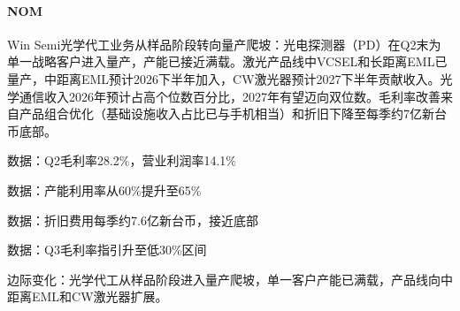 \documentclass[11pt]{ctexart}
\begin{document}
\paragraph{NOM} Win Semi光学代工业务从样品阶段转向量产爬坡：光电探测器（PD）在Q2末为单一战略客户进入量产，产能已接近满载。激光产品线中VCSEL和长距离EML已量产，中距离EML预计2026下半年加入，CW激光器预计2027下半年贡献收入。光学通信收入2026年预计占高个位数百分比，2027年有望迈向双位数。毛利率改善来自产品组合优化（基础设施收入占比已与手机相当）和折旧下降至每季约7亿新台币底部。
{\small\color{refgray}数据：Q2毛利率28.2\%，营业利润率14.1\%\par}
{\small\color{refgray}数据：产能利用率从60\%提升至65\%\par}
{\small\color{refgray}数据：折旧费用每季约7.6亿新台币，接近底部\par}
{\small\color{refgray}数据：Q3毛利率指引升至低30\%区间\par}
{\small\color{refgray}边际变化：光学代工从样品阶段进入量产爬坡，单一客户产能已满载，产品线向中距离EML和CW激光器扩展。\par}
\end{document}
